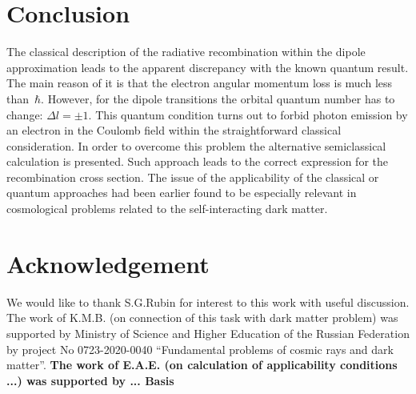 \documentclass{SovJurn/JETPL}
\begin{document}
\section{Conclusion}
The classical description of the radiative recombination within the dipole approximation leads to the apparent discrepancy with the known quantum result. The main reason of it is that the electron angular momentum loss is much less than~$\hbar$. However, for the dipole transitions the orbital quantum number has to change: $\Delta l=\pm 1$. This quantum condition turns out to forbid photon emission by an electron in the Coulomb field within the straightforward classical consideration.
In order to overcome this problem the alternative semiclassical calculation is presented. Such approach leads to the correct expression for the recombination cross section. The issue of the applicability of the classical or quantum approaches had been earlier found to be especially relevant in cosmological problems related to the self-interacting dark matter.
\section{Acknowledgement}

We would like to thank S.G.Rubin for interest to this work with useful discussion. The work of K.M.B. (on connection of this task with dark matter problem) was supported by Ministry of Science and Higher Education of the Russian Federation by project No 0723-2020-0040 “Fundamental problems of cosmic rays and dark matter”. \textbf{The work of E.A.E. (on calculation of applicability conditions ...) was supported by ... Basis }




\end{document}
